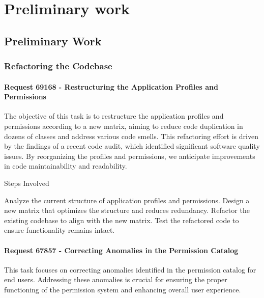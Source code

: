 %

\chapter{Preliminary work}
\label{cha:Preliminary work}


\section{Preliminary Work}

\subsection{Refactoring the Codebase}

\subsubsection{Request 69168 - Restructuring the Application Profiles and Permissions}

The objective of this task is to restructure the application profiles and permissions according to a new matrix, aiming to reduce code duplication in dozens of classes and address various code smells. This refactoring effort is driven by the findings of a recent code audit, which identified significant software quality issues. By reorganizing the profiles and permissions, we anticipate improvements in code maintainability and readability.

Steps Involved

     Analyze the current structure of application profiles and permissions.
     Design a new matrix that optimizes the structure and reduces redundancy.
     Refactor the existing codebase to align with the new matrix.
     Test the refactored code to ensure functionality remains intact.


\subsubsection{Request 67857 - Correcting Anomalies in the Permission Catalog}

This task focuses on correcting anomalies identified in the permission catalog for end users. Addressing these anomalies is crucial for ensuring the proper functioning of the permission system and enhancing overall user experience.

